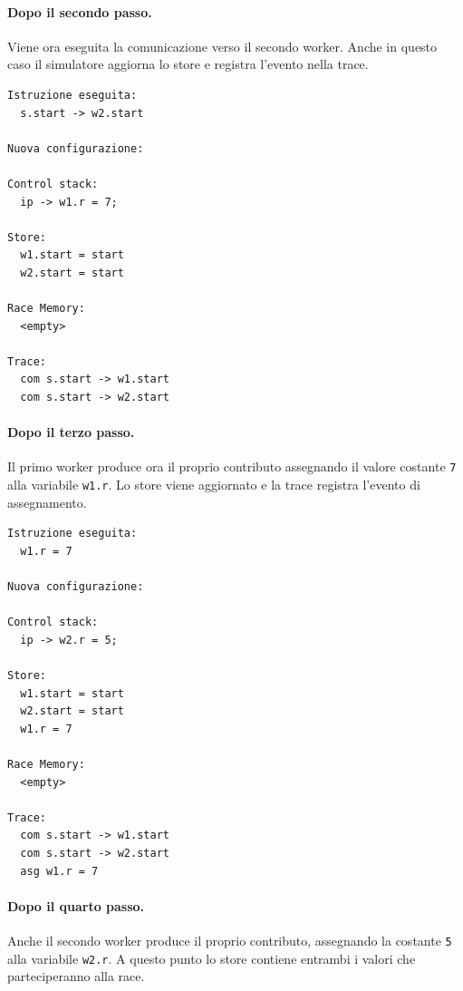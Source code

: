 \clearpage

\paragraph{Dopo il secondo passo.}
Viene ora eseguita la comunicazione verso il secondo worker. Anche in questo caso il simulatore aggiorna lo store e registra l’evento nella trace.

\begin{tcolorbox}[colback=black!2,colframe=black!35,boxrule=0.4pt,height=0.65\textheight]
\begin{verbatim}
Istruzione eseguita:
  s.start -> w2.start

Nuova configurazione:

Control stack:
  ip -> w1.r = 7;

Store:
  w1.start = start
  w2.start = start

Race Memory:
  <empty>

Trace:
  com s.start -> w1.start
  com s.start -> w2.start
\end{verbatim}
\end{tcolorbox}

\clearpage

\paragraph{Dopo il terzo passo.}
Il primo worker produce ora il proprio contributo assegnando il valore costante \texttt{7} alla variabile \texttt{w1.r}. Lo store viene aggiornato e la trace registra l’evento di assegnamento.

\begin{tcolorbox}[colback=black!2,colframe=black!35,boxrule=0.4pt,height=0.65\textheight]
\begin{verbatim}
Istruzione eseguita:
  w1.r = 7

Nuova configurazione:

Control stack:
  ip -> w2.r = 5;

Store:
  w1.start = start
  w2.start = start
  w1.r = 7

Race Memory:
  <empty>

Trace:
  com s.start -> w1.start
  com s.start -> w2.start
  asg w1.r = 7
\end{verbatim}
\end{tcolorbox}

\clearpage

\paragraph{Dopo il quarto passo.}
Anche il secondo worker produce il proprio contributo, assegnando la costante \texttt{5} alla variabile \texttt{w2.r}. A questo punto lo store contiene entrambi i valori che parteciperanno alla race.

